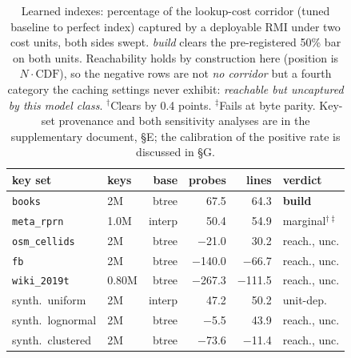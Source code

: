 \documentclass[letterpaper]{article} %
\begin{document}
\begin{table}[t]
\centering\footnotesize
\setlength{\tabcolsep}{2pt}
\begin{tabular}{llrrrl}
\toprule
key set & keys & base & probes & lines & verdict \\
\midrule
\texttt{books} & 2M & btree & 67.5 & 64.3 & \textbf{build} \\
\texttt{meta\_rprn} & 1.0M & interp & 50.4 & 54.9 & marginal$^{\dagger\ddagger}$ \\
\texttt{osm\_cellids} & 2M & btree & $-$21.0 & 30.2 & reach., unc. \\
\texttt{fb} & 2M & btree & $-$140.0 & $-$66.7 & reach., unc. \\
\texttt{wiki\_2019t} & 0.80M & btree & $-$267.3 & $-$111.5 & reach., unc. \\
\midrule
synth.\ uniform & 2M & interp & 47.2 & 50.2 & unit-dep. \\
synth.\ lognormal & 2M & btree & $-$5.5 & 43.9 & reach., unc. \\
synth.\ clustered & 2M & btree & $-$73.6 & $-$11.4 & reach., unc. \\
\bottomrule
\end{tabular}
\caption{Learned indexes: percentage of the lookup-cost corridor (tuned baseline to perfect index) captured by a deployable RMI under two cost units, both sides swept. \emph{build} clears the pre-registered 50\% bar on both units. Reachability holds by construction here (position is $N\cdot\mathrm{CDF}$), so the negative rows are not \emph{no corridor} but a fourth category the caching settings never exhibit: \emph{reachable but uncaptured by this model class}. $^\dagger$Clears by 0.4 points. $^\ddagger$Fails at byte parity. Key-set provenance and both sensitivity analyses are in the supplementary document, \S E; the calibration of the positive rate is discussed in \S G.}
\label{tab:index}
\end{table}
\end{document}
